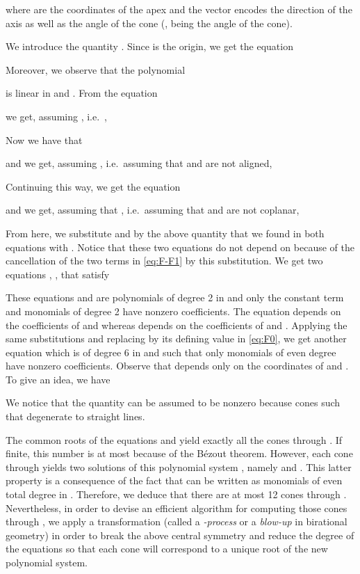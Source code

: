 \documentclass[5p]{elsarticle}
\newcommand{\com}[1]{{\color{black} #1}}
\begin{document}
where  are the coordinates of the apex and the vector  encodes the direction of the axis as well as the angle of the cone (,  being the angle of the cone).

We introduce the quantity . Since  is the origin, we get the equation

Moreover, we observe that the polynomial

is linear in  and . From the equation

we get, assuming , i.e.~,

Now we have that

and we get, assuming , i.e.~assuming that  and  are not aligned,

Continuing this way, we get the equation

\com{and we get}, assuming that , i.e.~assuming that  and  are not coplanar,

From here, we substitute  and  by the above quantity that we found in both equations  with . \com{Notice} that these two equations do not depend on  because of the cancellation of the two terms  in \eqref{eq:F-F1} by this substitution. We get two equations , , that satisfy

These equations  and  are polynomials of degree 2 in  and only the constant term and monomials of degree 2 have nonzero coefficients. The equation  depends on the coefficients of  and  whereas  depends on the coefficients of  and .   \com{Applying} the same substitutions and replacing  by its defining value in \eqref{eq:F0}, we get another equation  which is of degree 6 in  and such that only monomials of even degree have nonzero coefficients. Observe that  \com{depends only on} the coordinates of  and . To give an idea, we have

We notice that the quantity  can be assumed to be nonzero because cones such that  \com{degenerate} to straight lines. 
 
 
The common roots of the equations  and  \com{yield} exactly all the cones through . If finite, this number is at most   because of the B\'ezout theorem. However, each cone through  yields two solutions of this polynomial system , namely  and . This latter property is a consequence of the fact that  \com{can be written as} monomials of even total degree in . Therefore, we deduce that \com{there are} at most 12 cones through . Nevertheless, in order to devise an efficient algorithm for computing those cones through , we apply a transformation (called a \emph{-process} or a \emph{blow-up} in birational geometry) in order to break the above central symmetry and reduce the degree of the equations so that each cone will correspond to a unique root of the new polynomial system. 
\end{document}
